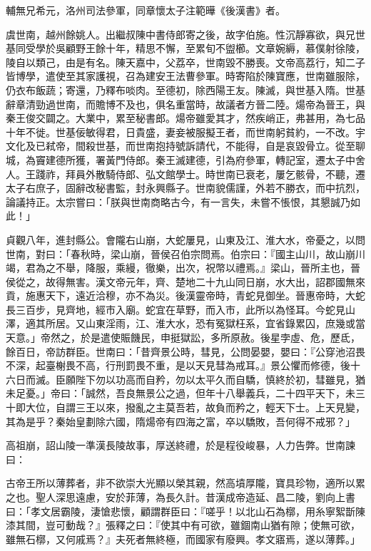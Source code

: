 \begin{pinyinscope}
 輔無兄希元，洛州司法參軍，同章懷太子注範曄《後漢書》者。



 虞世南，越州餘姚人。出繼叔陳中書侍郎寄之後，故字伯施。性沉靜寡欲，與兄世基同受學於吳顧野王餘十年，精思不懈，至累旬不盥櫛。文章婉縟，慕僕射徐陵，陵自以類己，由是有名。陳天嘉中，父荔卒，世南毀不勝喪。文帝高荔行，知二子皆博學，遣使至其家護視，召為建安王法曹參軍。時寄陷於陳寶應，世南雖服除，仍衣布飯蔬；寄還，乃釋布啖肉。至德初，除西陽王友。陳滅，與世基入隋。世基辭章清勁過世南，而贍博不及也，俱名重當時，故議者方晉二陸。煬帝為晉王，與秦王俊交闢之。大業中，累至秘書郎。煬帝雖愛其才，然疾峭正，弗甚用，為七品十年不徙。世基佞敏得君，日貴盛，妻妾被服擬王者，而世南躬貧約，一不改。宇文化及已弒帝，間殺世基，而世南抱持號訴請代，不能得，自是哀毀骨立。從至聊城，為竇建德所獲，署黃門侍郎。秦王滅建德，引為府參軍，轉記室，遷太子中舍人。王踐祚，拜員外散騎侍郎、弘文館學士。時世南已衰老，屢乞骸骨，不聽，遷太子右庶子，固辭改秘書監，封永興縣子。世南貌儒謹，外若不勝衣，而中抗烈，論議持正。太宗嘗曰：「朕與世南商略古今，有一言失，未嘗不悵恨，其懇誠乃如此！」



 貞觀八年，進封縣公。會隴右山崩，大蛇屢見，山東及江、淮大水，帝憂之，以問世南，對曰：「春秋時，梁山崩，晉侯召伯宗問焉。伯宗曰：『國主山川，故山崩川竭，君為之不舉，降服，乘縵，徹樂，出次，祝幣以禮焉。』梁山，晉所主也，晉侯從之，故得無害。漢文帝元年，齊、楚地二十九山同日崩，水大出，詔郡國無來貢，施惠天下，遠近洽穆，亦不為災。後漢靈帝時，青蛇見御坐。晉惠帝時，大蛇長三百步，見齊地，經市入廟。蛇宜在草野，而入市，此所以為怪耳。今蛇見山澤，適其所居。又山東淫雨，江、淮大水，恐有冤獄枉系，宜省錄累囚，庶幾或當天意。」帝然之，於是遣使賑饑民，申挺獄訟，多所原赦。後星孛虛、危，歷氐，餘百日，帝訪群臣。世南曰：「昔齊景公時，彗見，公問晏嬰，嬰曰：『公穿池沼畏不深，起臺榭畏不高，行刑罰畏不重，是以天見彗為戒耳。』景公懼而修德，後十六日而滅。臣願陛下勿以功高而自矜，勿以太平久而自驕，慎終於初，彗雖見，猶未足憂。」帝曰：「誠然，吾良無景公之過，但年十八舉義兵，二十四平天下，未三十即大位，自謂三王以來，撥亂之主莫吾若，故負而矜之，輕天下士。上天見變，其為是乎？秦始皇劃除六國，隋煬帝有四海之富，卒以驕敗，吾何得不戒邪？」



 高祖崩，詔山陵一準漢長陵故事，厚送終禮，於是程役峻暴，人力告弊。世南諫曰：



 古帝王所以薄葬者，非不欲崇大光顯以榮其親，然高墳厚隴，寶具珍物，適所以累之也。聖人深思遠慮，安於菲薄，為長久計。昔漢成帝造延、昌二陵，劉向上書曰：「孝文居霸陵，淒愴悲懷，顧謂群臣曰：『嗟乎！以北山石為槨，用糸寧絮斮陳漆其間，豈可動哉？』張釋之曰：『使其中有可欲，雖錮南山猶有隙；使無可欲，雖無石槨，又何戚焉？』夫死者無終極，而國家有廢興。孝文寤焉，遂以薄葬。」




\end{pinyinscope}
